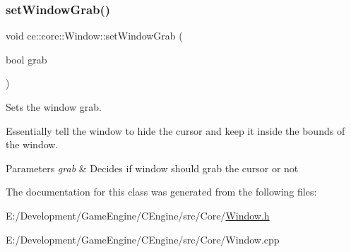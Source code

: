 \subsubsection{\texorpdfstring{set\+Window\+Grab()}{setWindowGrab()}}
{\footnotesize\ttfamily void ce\+::core\+::\+Window\+::set\+Window\+Grab (\begin{DoxyParamCaption}\item[{bool}]{grab }\end{DoxyParamCaption})}



Sets the window grab. 

Essentially tell the window to hide the cursor and keep it inside the bounds of the window.


\begin{DoxyParams}{Parameters}
{\em grab} & Decides if window should grab the cursor or not \\
\hline
\end{DoxyParams}


The documentation for this class was generated from the following files\+:\begin{DoxyCompactItemize}
\item 
E\+:/\+Development/\+Game\+Engine/\+C\+Engine/src/\+Core/\hyperlink{_window_8h}{Window.\+h}\item 
E\+:/\+Development/\+Game\+Engine/\+C\+Engine/src/\+Core/Window.\+cpp\end{DoxyCompactItemize}
